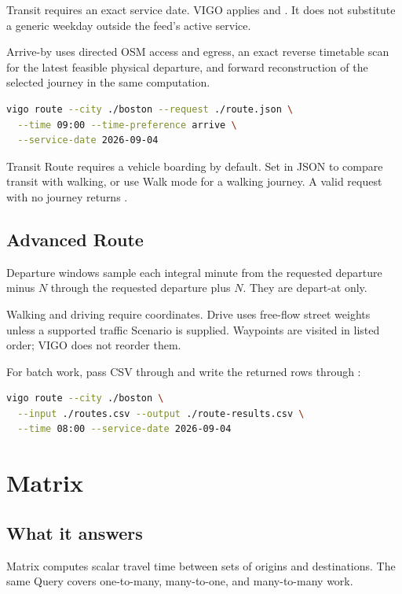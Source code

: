 \documentclass[10pt,letterpaper]{article}
\begin{document}
Transit requires an exact service date. VIGO applies  and . It does not substitute a generic weekday outside the feed's active service.

Arrive-by uses directed OSM access and egress, an exact reverse timetable scan for the latest feasible physical departure, and forward reconstruction of the selected journey in the same computation.

\begin{lstlisting}[language=bash]
vigo route --city ./boston --request ./route.json \
  --time 09:00 --time-preference arrive \
  --service-date 2026-09-04
\end{lstlisting}

Transit Route requires a vehicle boarding by default. Set  in JSON to compare transit with walking, or use Walk mode for a walking journey. A valid request with no journey returns .

\subsection{Advanced Route}

Departure windows sample each integral minute from the requested departure minus $N$ through the requested departure plus $N$. They are depart-at only.

Walking and driving require coordinates. Drive uses free-flow street weights unless a supported traffic Scenario is supplied. Waypoints are visited in listed order; VIGO does not reorder them.

For batch work, pass CSV through \field{--input} and write the returned rows through \field{--output}:

\begin{lstlisting}[language=bash]
vigo route --city ./boston \
  --input ./routes.csv --output ./route-results.csv \
  --time 08:00 --service-date 2026-09-04
\end{lstlisting}

\section{Matrix}

\subsection{What it answers}

Matrix computes scalar travel time between sets of origins and destinations. The same Query covers one-to-many, many-to-one, and many-to-many work.
\end{document}
